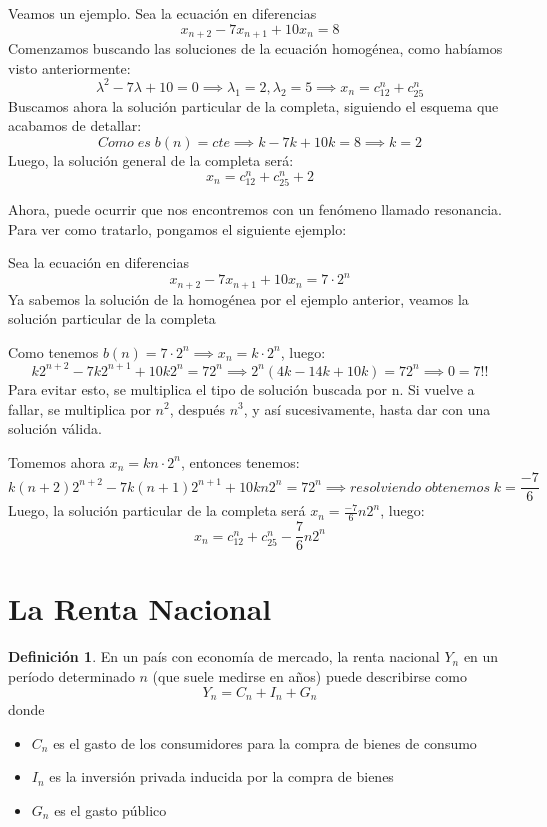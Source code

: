 \documentclass[a4paper, 12pt]{article}
\theoremstyle{plain}
\theoremstyle{definition}
\newtheorem{definicion}[teorema]{Definición}
\theoremstyle{remark}
\begin{document}
	\textcolor{Azul}{Veamos un ejemplo. Sea la ecuación en diferencias \[x_{n+2}-7x_{n+1}+10x_n=8\]}
	\textcolor{Azul}{Comenzamos buscando las soluciones de la ecuación homogénea, como habíamos visto anteriormente:
	\[\lambda^2-7\lambda+10=0\implies\lambda_1=2,\lambda_2=5\implies x_n=c_12^n+c_25^n\]}
	\textcolor{Azul}{Buscamos ahora la solución particular de la completa, siguiendo el esquema que acabamos de detallar:
	\[Como\;es\;b(n)=cte \implies k-7k+10k=8\implies k=2\]}
	\textcolor{Azul}{Luego, la solución general de la completa será: \[x_n=c_12^n+c_25^n+2\]}
	
	Ahora, puede ocurrir que nos encontremos con un fenómeno llamado resonancia. Para ver como tratarlo, pongamos el siguiente ejemplo:
	
	\textcolor{Azul}{Sea la ecuación en diferencias \[x_{n+2}-7x_{n+1}+10x_n=7\cdot2^n\]}
	\textcolor{Azul}{Ya sabemos la solución de la homogénea por el ejemplo anterior, veamos la solución particular de la completa}
	
	\textcolor{Azul}{Como tenemos $b(n)=7\cdot2^n \implies x_n= k\cdot2^n$, luego:
	\[k2^{n+2}-7k2^{n+1}+10k2^n=72^n\implies2^n(4k-14k+10k)=72^n\implies 0=7 !!\]}
	Para evitar esto, se multiplica el tipo de solución buscada por n. Si vuelve a fallar, se multiplica por $n^2$, después $n^3$, y así sucesivamente, hasta dar con una solución válida.
	
	\bigskip
	\textcolor{Azul}{Tomemos ahora $x_n= kn\cdot2^n$, entonces tenemos: \[k(n+2)2^{n+2}-7k(n+1)2^{n+1}+10kn2^n=72^n\implies resolviendo\; obtenemos\; k=\frac{-7}{6}\]}
	\textcolor{Azul}{Luego, la solución particular de la completa será $x_n=\frac{-7}{6}n2^n$, luego: \[x_n=c_12^n+c_25^n-\frac{7}{6}n2^n\]}
	
	\section{La Renta Nacional}
	\begin{definicion}\label{renta}
		En un país con economía de mercado, la renta nacional $Y_n$ en un período determinado $n$ (que suele medirse en años) puede describirse como
		\[Y_n=C_n+I_n+G_n\]
		donde 
		\begin{itemize}
			\item $C_n$ es el gasto de los consumidores para la compra de bienes de consumo
			\item $I_n$ es la inversión privada inducida por la compra de bienes
			\item $G_n$ es el gasto público
		\end{itemize}
	\end{definicion}
	
\end{document}
